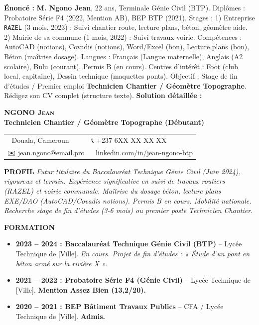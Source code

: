 \documentclass[11pt]{article}
\begin{document}
\begin{exoresolu}
\textbf{Énoncé :} \textbf{M. Ngono Jean}, 22 ans, Terminale Génie Civil (BTP). Diplômes : Probatoire Série F4 (2022, Mention AB), BEP BTP (2021). Stages : 1) Entreprise \texttt{RAZEL} (3 mois, 2023) : Suivi chantier route, lecture plans, béton, géomètre aide. 2) Mairie de sa commune (1 mois, 2022) : Suivi travaux voirie. Compétences : AutoCAD (notions), Covadis (notions), Word/Excel (bon), Lecture plans (bon), Béton (maîtrise dosage). Langues : Français (Langue maternelle), Anglais (A2 scolaire), Bulu (courant). Permis B (en cours). Centres d'intérêt : Foot (club local, capitaine), Dessin technique (maquettes ponts). Objectif : Stage de fin d'études / Premier emploi \textbf{Technicien Chantier / Géomètre Topographe}. Rédigez son CV complet (structure texte).
\tcblower
\textbf{Solution détaillée :}

\begin{center}
\textbf{\LARGE NGONO \textsc{Jean}} \\[0.5em]
\textbf{Technicien Chantier / Géomètre Topographe (Débutant)} \\[0.5em]
\begin{tabular}{ll}
📍 Douala, Cameroun & 📞 +237 6XX XX XX XX \\
✉️ jean.ngono@email.pro & 🔗 linkedin.com/in/jean-ngono-btp
\end{tabular}
\end{center}

\textbf{PROFIL}
\emph{Futur titulaire du Baccalauréat Technique Génie Civil (Juin 2024), rigoureux et terrain. Expérience significative en suivi de travaux routiers (RAZEL) et voirie communale. Maîtrise du dosage béton, lecture plans EXE/DAO (AutoCAD/Covadis notions). Permis B en cours. Mobilité nationale. Recherche stage de fin d'études (3-6 mois) ou premier poste Technicien Chantier.}

\textbf{FORMATION}
\begin{itemize}
    \item \textbf{2023 -- 2024 : Baccalauréat Technique Génie Civil (BTP)} -- Lycée Technique de [Ville]. \textit{En cours. Projet de fin d'études : « Étude d'un pont en béton armé sur la rivière X ».}
    \item \textbf{2021 -- 2022 : Probatoire Série F4 (Génie Civil)} -- Lycée Technique de [Ville]. \textbf{Mention Assez Bien (13,2/20).}
    \item \textbf{2020 -- 2021 : BEP Bâtiment Travaux Publics} -- CFA / Lycée Technique de [Ville]. \textbf{Admis.}
\end{itemize}


\end{exoresolu}
\end{document}
